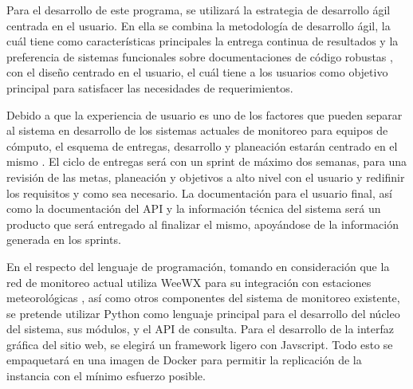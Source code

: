 Para el desarrollo de este programa, se utilizará la estrategia de desarrollo ágil centrada en el usuario. En ella se combina la metodología de desarrollo ágil, la cuál tiene como características principales la entrega continua de resultados y la preferencia de sistemas funcionales sobre documentaciones de código robustas \cite{agile_manifesto}, con el diseño centrado en el usuario, el cuál tiene a los usuarios como objetivo principal para satisfacer las necesidades de requerimientos.


Debido a que la experiencia de usuario es uno de los factores que pueden separar al sistema en desarrollo de los sistemas actuales de monitoreo para equipos de cómputo, el esquema de entregas, desarrollo y planeación estarán centrado en el mismo \cite{hussain_agile_usercentered}. El ciclo de entregas será con un sprint de máximo dos semanas, para una revisión de las metas, planeación y objetivos a alto nivel con el usuario y redifinir los requisitos y como sea necesario. La documentación para el usuario final, así como la documentación del API y la información técnica del sistema será un producto que será entregado al finalizar el mismo, apoyándose de la información generada en los sprints.



En el respecto del lenguaje de programación, tomando en consideración que la red de monitoreo actual utiliza WeeWX para su integración con estaciones meteorológicas \cite{red_climatologica_uacj}, así como otros componentes del sistema de monitoreo existente, se pretende utilizar Python como lenguaje principal para el desarrollo del núcleo del sistema, sus módulos, y el API de consulta. Para el desarrollo de la interfaz gráfica del sitio web, se elegirá un framework ligero con Javscript. Todo esto se empaquetará en una imagen de Docker para permitir la replicación de la instancia con el mínimo esfuerzo posible.


